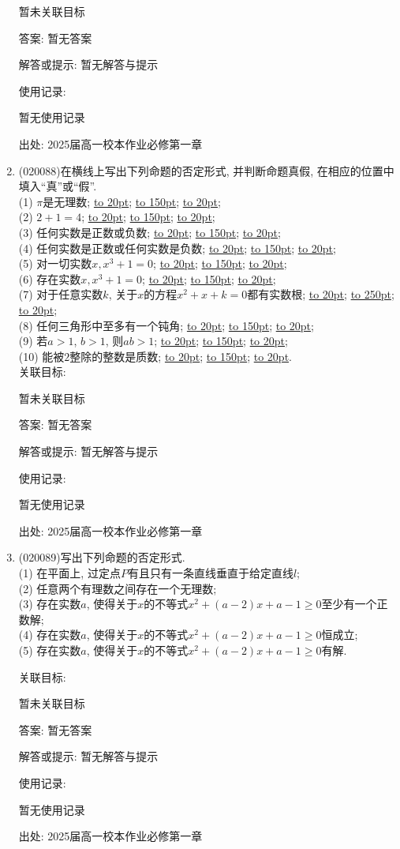 \documentclass[10pt,a4paper]{article}
\newcommand{\blank}[1]{\underline{\hbox to #1pt{}}}
\begin{document}
\begin{enumerate}[1.]
暂未关联目标

答案: 暂无答案

解答或提示: 暂无解答与提示

使用记录:

暂无使用记录


出处: 2025届高一校本作业必修第一章
\item { (020088)}在横线上写出下列命题的否定形式, 并判断命题真假, 在相应的位置中填入``真''或``假''.\\
(1) $\pi$是无理数; \blank{20}; \blank{150}; \blank{20};\\
(2) $2+1=4$;  \blank{20}; \blank{150}; \blank{20};\\
(3) 任何实数是正数或负数;  \blank{20}; \blank{150}; \blank{20};\\
(4) 任何实数是正数或任何实数是负数;  \blank{20}; \blank{150}; \blank{20};\\
(5) 对一切实数$x, x^3+1=0$;  \blank{20}; \blank{150}; \blank{20};\\
(6) 存在实数$x, x^3+1=0$;  \blank{20}; \blank{150}; \blank{20};\\
(7) 对于任意实数$k$, 关于$x$的方程$x^2+x+k=0$都有实数根;  \blank{20}; \blank{250}; \blank{20};\\
(8) 任何三角形中至多有一个钝角;  \blank{20}; \blank{150}; \blank{20};\\
(9) 若$a>1$, $b>1$, 则$ab>1$;  \blank{20}; \blank{150}; \blank{20};\\
(10) 能被$2$整除的整数是质数;  \blank{20}; \blank{150}; \blank{20}.\\


关联目标:

暂未关联目标

答案: 暂无答案

解答或提示: 暂无解答与提示

使用记录:

暂无使用记录


出处: 2025届高一校本作业必修第一章
\item { (020089)}写出下列命题的否定形式.\\
(1) 在平面上, 过定点$P$有且只有一条直线垂直于给定直线$l$;\\
(2) 任意两个有理数之间存在一个无理数;\\
(3) 存在实数$a$, 使得关于$x$的不等式$x^2+(a-2)x+a-1\ge 0$至少有一个正数解;\\
(4) 存在实数$a$, 使得关于$x$的不等式$x^2+(a-2)x+a-1\ge 0$恒成立;\\
(5) 存在实数$a$, 使得关于$x$的不等式$x^2+(a-2)x+a-1\ge 0$有解.


关联目标:

暂未关联目标

答案: 暂无答案

解答或提示: 暂无解答与提示

使用记录:

暂无使用记录


出处: 2025届高一校本作业必修第一章
\end{enumerate}
\end{document}
